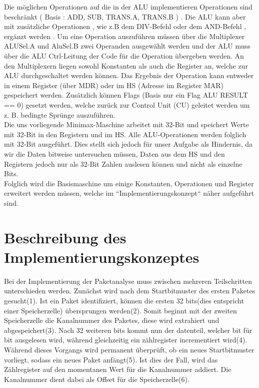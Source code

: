 \documentclass[12pt,titlepage,german,a4]{article}
\begin{document}
    Die m{\"o}glichen Operationen auf die in der ALU implementieren Operationen sind beschr{\"a}nkt ( Basis :  ADD, SUB, TRANS.A, TRANS.B ) . Die ALU kann aber mit zus{\"a}tzliche Operationen , wie z.B dem DIV-Befehl oder dem AND-Befehl , erg{\"a}nzt werden .
    Um eine Operation auszuf{\"u}hren m{\"u}ssen {\"u}ber die Multiplexer ALUSel.A und AluSel.B zwei
    Operanden ausgew{\"a}hlt werden und der ALU muss {\"u}ber die ALU Ctrl-Leitung der Code
    f{\"u}r die Operation {\"u}bergeben werden. An den Multiplexern liegen sowohl Konstanten als
    auch die Register an, welche zur ALU durchgeschaltet werden k{\"o}nnen. Das Ergebnis der
    Operation kann entweder in einem Register ({\"u}ber MDR) oder im HS (Adresse im Register
    MAR) gespeichert werden. Zus{\"a}tzlich k{\"o}nnen Flags (Basis nur ein Flag ALU RESULT ==
    0) gesetzt werden, welche zur{\"u}ck zur Control Unit (CU) geleitet werden um z. B. bedingte
    Spr{\"u}nge auszuf{\"u}hren. \\
    Die uns vorliegende Minimax-Maschine arbeitet mit 32-Bit und speichert Werte mit
    32-Bit in den Registern und im HS. Alle ALU-Operationen werden folglich mit 32-Bit ausgef{\"u}hrt. Dies stellt sich jedoch f{\"u}r unser Aufgabe als Hindernis, da wir die Daten
    bitweise untersuchen m{\"u}ssen, Daten aus dem HS und den Registern jedoch nur als 32-Bit
    Zahlen auslesen k{\"o}nnen und nicht als einzelne Bits.\\
    Folglich wird die Basismaschine um einige Konstanten, Operationen und Register erweitert
    werden m{\"u}ssen, welche im “Implementierungskonzept“ n{\"a}her aufgef{\"u}hrt sind.

    \section{Beschreibung des Implementierungskonzeptes}
    Bei der Implementierung der Paketanalyse muss zwischen mehreren Teilschritten unterschieden werden. Zun{\"a}chst wird nach dem Startbitmuster des ersten Paketes gesucht(1). Ist ein Paket identifiziert, k{\"o}nnen die ersten 32 bits(dies entspricht einer Speicherzelle) {\"u}bersprungen werden(2). Somit beginnt mit der zweiten Speicherzelle die Kanalnummer des Paketes, diese wird extrahiert und abgespeichert(3). Nach 32 weiteren bits kommt nun der datenteil, welcher bit f{\"u}r bit ausgelesen wird, w{\"a}hrend gleichzeitig ein z{\"a}hlregister incrementiert wird(4). W{\"a}hrend dieses Vorgangs wird permanent {\"u}berpr{\"u}ft, ob ein neues Startbitmuster vorliegt, sodass ein neues Paket anf{\"a}ngt(5). Ist dies der Fall, wird das Z{\"a}hlregister auf den momentanen Wert f{\"u}r die Kanalnummer addiert. Die Kanalnummer dient dabei als Offset f{\"u}r die Speicherzelle(6).
\end{document}
